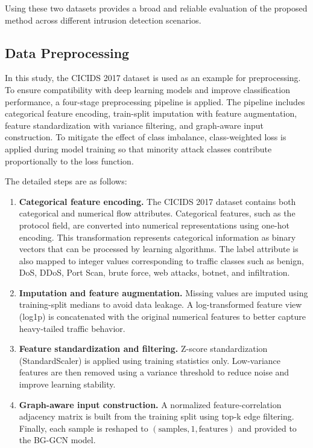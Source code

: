 \documentclass[a4paper,fleqn]{cas-sc}
\begin{document}
Using these two datasets provides a broad and reliable evaluation of the proposed method across different intrusion detection scenarios.

\subsection{Data Preprocessing}

In this study, the CICIDS 2017 dataset is used as an example for preprocessing. To ensure compatibility with deep learning models and improve classification performance, a four-stage preprocessing pipeline is applied. The pipeline includes categorical feature encoding, train-split imputation with feature augmentation, feature standardization with variance filtering, and graph-aware input construction. To mitigate the effect of class imbalance, class-weighted loss is applied during model training so that minority attack classes contribute proportionally to the loss function.

The detailed steps are as follows:
\begin{enumerate}
\item \textbf{Categorical feature encoding.} The CICIDS 2017 dataset contains both categorical and numerical flow attributes. Categorical features, such as the protocol field, are converted into numerical representations using one-hot encoding. This transformation represents categorical information as binary vectors that can be processed by learning algorithms. The label attribute is also mapped to integer values corresponding to traffic classes such as benign, DoS, DDoS, Port Scan, brute force, web attacks, botnet, and infiltration.

\item \textbf{Imputation and feature augmentation.} Missing values are imputed using training-split medians to avoid data leakage. A log-transformed feature view (log1p) is concatenated with the original numerical features to better capture heavy-tailed traffic behavior.

\item \textbf{Feature standardization and filtering.} Z-score standardization (StandardScaler) is applied using training statistics only. Low-variance features are then removed using a variance threshold to reduce noise and improve learning stability.

\item \textbf{Graph-aware input construction.} A normalized feature-correlation adjacency matrix is built from the training split using top-k edge filtering. Finally, each sample is reshaped to $(\text{samples}, 1, \text{features})$ and provided to the BG-GCN model.
\end{enumerate}
\end{document}
